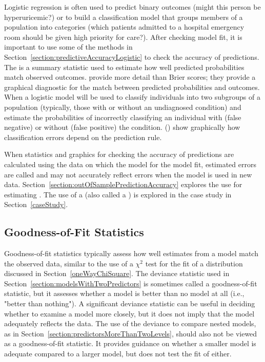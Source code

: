Logistic regression is often used to predict binary outcomes (might this person be hyperuricemic?) or to build a classification model that groups members of a population into categories (which patients admitted to a hospital emergency room should be given high priority for care?).  After checking model fit, it is important to use some of the methods in Section~\ref{section:predictiveAccuracyLogistic} to check the accuracy of predictions.  The  is a summary statistic used to estimate how well predicted probabilities match observed outcomes.   provide more detail than Brier scores; they provide a graphical diagnostic for the match between predicted probabilities and outcomes.  When a logistic model will be used to classify individuals into two subgroups of a population (typically, those with or without an undiagnosed condition)  and  estimate the probabilities of incorrectly classifying an individual with (false negative) or without (false positive) the condition.   () show graphically how classification errors depend on the prediction rule.

When statistics and graphics for checking the accuracy of predictions are calculated using the data on which the model for the model fit, estimated errors are called  and may not accurately reflect errors when the model is used in new data.  Section~\ref{section:outOfSamplePredictionAccuracy} explores the use  for estimating .  The use of a  (also called a ) is explored in the case study in Section~\ref{caseStudy}.

\subsection{Goodness-of-Fit Statistics}
\label{section:goodnesOfFitLogistic}

Goodness-of-fit statistics typically assess how well estimates from a model match the observed data, similar to the use of a $\chi^2$ test for the fit of a distribution discussed in Section~\ref{oneWayChiSquare}. The deviance statistic used in Section~\ref{section:modelsWithTwoPredictors} is sometimes called a goodness-of-fit statistic, but it assesses whether a model is better than no model at all (i.e., "better than nothing"). A significant deviance statistic can be useful in deciding whether to examine a model more closely, but it does not imply that the model adequately reflects the data.  The use of the deviance to compare nested models, as in  Section~\ref{section:predictorsMoreThanTwoLevels}, should also not be viewed as a goodness-of-fit statistic.  It provides guidance on whether a smaller model is adequate compared to a larger model, but does not test the fit of either.

